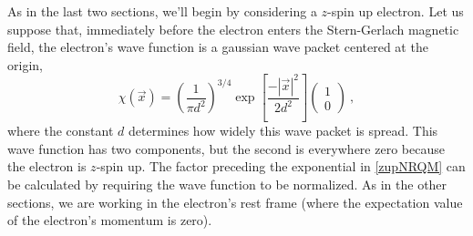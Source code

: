 \documentclass[12pt,secnumarabic,amsmath,amssymb,balancelastpage,nofootinbib]{article}
\begin{document}
As in the last two sections, we'll begin by considering a $z$-spin up electron.  Let us suppose that, immediately before the electron enters the Stern-Gerlach magnetic field, the electron's wave function is a gaussian wave packet centered at the origin,
\begin{equation}
\chi(\vec{x}) = \left(\frac{1}{\pi d^2}\right)^{3/4}  \exp\left[\frac{-|\vec{x}|^2}{2 d^2}\right] \left(\begin{matrix} 1\\0 \end{matrix}\right)
\ ,
\label{zupNRQM}
\end{equation}
where the constant $d$ determines how widely this wave packet is spread.  This wave function has two components, but the second is everywhere zero because the electron is $z$-spin up.  The factor preceding the exponential in \eqref{zupNRQM} can be calculated by requiring the wave function to be normalized.  As in the other sections, we are working in the electron's rest frame (where the expectation value of the electron's momentum is zero).
\end{document}
